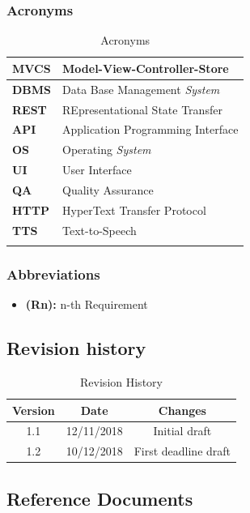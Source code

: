 \documentclass[titlepage]{article}
\begin{document}
	
	\subsubsection{Acronyms}
	
	\begin{longtable}{| p{2 cm} | p{7 cm} |} \hline
		{\bf MVCS} & Model-View-Controller-Store \\\hline
		{\bf DBMS} & Data Base Management {\it System} \\ \hline
		{\bf REST} & REpresentational State Transfer \\ \hline
		{\bf API} & Application Programming Interface \\ \hline
		{\bf OS} & Operating {\it System}\\ \hline
		{\bf UI} & User Interface \\ \hline
		{\bf QA} & Quality Assurance \\ \hline		
		{\bf HTTP} & HyperText Transfer Protocol \\ \hline	
		{\bf TTS} & Text-to-Speech \\ \hline
		\caption{Acronyms}	
						
	\end{longtable}

	\subsubsection{Abbreviations}
	
	\begin{itemize}
		\item {\bf (Rn):} n-th Requirement
	\end{itemize}
			
			
\subsection{Revision history}

\begin{table}[ht]
	\centering
	\begin{tabular}{ccc} 
		Version & Date & Changes  \\ 
		\hline
		1.1 & 12/11/2018 & Initial draft \\
		1.2 & 10/12/2018 & First deadline draft \\
	\end{tabular}
	\caption{Revision History}
	\label{default}
\end{table}
	
	
\subsection{Reference Documents}
\end{document}
